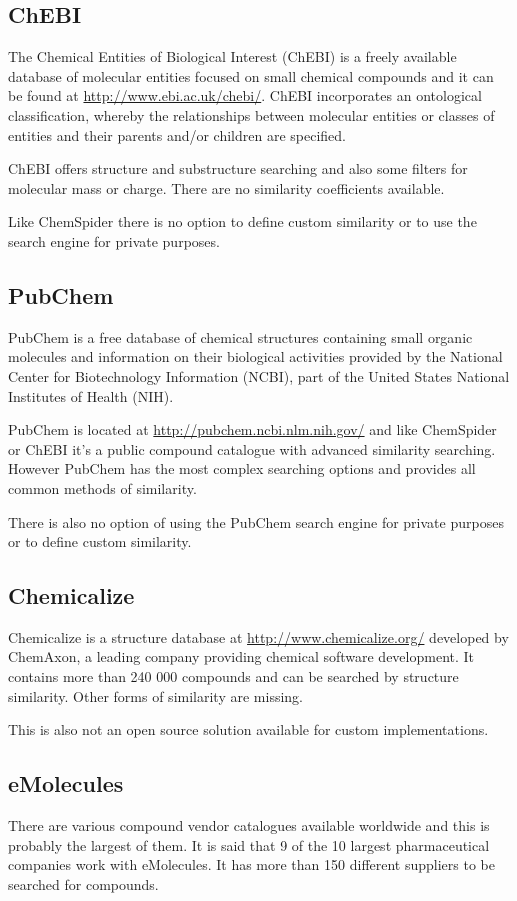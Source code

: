 \documentclass[thesis=M,english]{FITthesis}[2012/10/20]
\begin{document}
\subsection{ChEBI}
The Chemical Entities of Biological Interest (ChEBI) is a freely available database of molecular entities focused on small chemical compounds and it can be found at \url{http://www.ebi.ac.uk/chebi/}. ChEBI incorporates an ontological classification, whereby the relationships between molecular entities or classes of entities and their parents and/or children are specified.\cite{taverna}

ChEBI offers structure and substructure searching and also some filters for molecular mass or charge. There are no similarity coefficients available.

Like ChemSpider there is no option to define custom similarity or to use the search engine for private purposes.

\subsection{PubChem}
PubChem is a free database of chemical structures containing small organic molecules and information on their biological activities provided by the National Center for Biotechnology Information (NCBI), part of the United States National Institutes of Health (NIH). \cite{taverna}

PubChem is located at \url{http://pubchem.ncbi.nlm.nih.gov/} and like ChemSpider or ChEBI it’s a public compound catalogue with advanced similarity searching. However PubChem has the most complex searching options and provides all common methods of similarity.

There is also no option of using the PubChem search engine for private purposes or to define custom similarity.

\subsection{Chemicalize}
Chemicalize is a structure database at \url{http://www.chemicalize.org/} developed by ChemAxon, a leading company providing chemical software development. It contains more than 240 000 compounds and can be searched by structure similarity. Other forms of similarity are missing.

This is also not an open source solution available for custom implementations.

\subsection{eMolecules}
There are various compound vendor catalogues available worldwide and this is probably the largest of them. It is said that 9 of the 10 largest pharmaceutical companies work with eMolecules. It has more than 150 different suppliers to be searched for compounds.\cite{emolecules}
\end{document}
